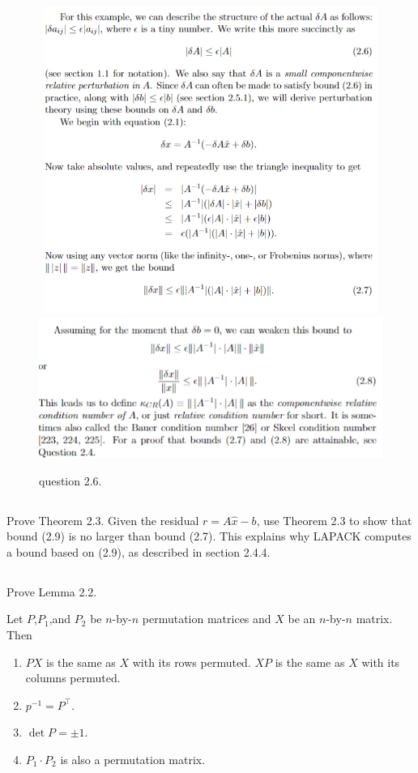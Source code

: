 \documentclass[a4paper]{ctexart}
\newcommand{\pf}{\textbf{\color{pink}{proof:}}}
\begin{document}
\begin{figure}[h]
    \centering
    \includegraphics[width=12cm,height=10cm]{figure/question2_6_1.png}
    \includegraphics{figure/question2_6_2.png}
    \caption{question 2.6.}
    \label{fig:2_6}
\end{figure}

\pf

\subsection{}
Prove Theorem 2.3. Given the residual $r = A\hat{x} - b$,
use Theorem 2.3 to show that bound (2.9) is no larger than bound (2.7). This
explains why LAPACK computes a bound based on (2.9), as described in
section 2.4.4.

\subsection{}
Prove Lemma 2.2.

Let $P$,$P_1$,and $P_2$ be $n$-by-$n$ permutation matrices and $X$ be an $n$-by-$n$ matrix.  Then
\begin{enumerate}
    \item $PX$ is the same as $X$ with its rows permuted. $XP$ is the same as $X$ with its columns permuted.
    \item $p^{-1} = P^\top$.
    \item $\det P = \pm 1$.
    \item $P_1 \cdot P_2$ is also a permutation matrix.
\end{enumerate}
\end{document}
